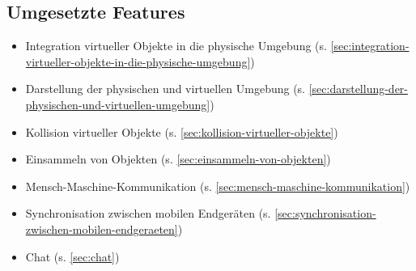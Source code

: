 \subsection{Umgesetzte Features}
\begin{itemize}
	\item Integration virtueller Objekte in die physische Umgebung (s. \ref {sec:integration-virtueller-objekte-in-die-physische-umgebung})
	\item Darstellung der physischen und virtuellen Umgebung (s. \ref{sec:darstellung-der-physischen-und-virtuellen-umgebung})
	\item Kollision virtueller Objekte  (s. \ref{sec:kollision-virtueller-objekte})
	\item Einsammeln von Objekten (s. \ref{sec:einsammeln-von-objekten})
	\item Mensch-Maschine-Kommunikation (s. \ref{sec:mensch-maschine-kommunikation})
	\item Synchronisation zwischen mobilen Endgeräten (s. \ref{sec:synchronisation-zwischen-mobilen-endgeraeten})
	\item Chat (s. \ref{sec:chat})
\end{itemize}